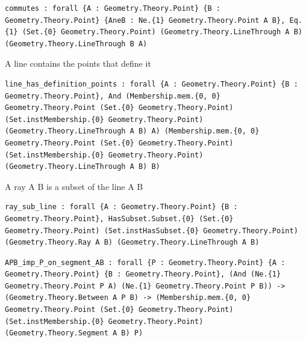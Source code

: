 \begin{theorem}
  \label{Geometry.Theory.Line.commutes}
  \leanok
\begin{verbatim}commutes : forall {A : Geometry.Theory.Point} {B : Geometry.Theory.Point} {AneB : Ne.{1} Geometry.Theory.Point A B}, Eq.{1} (Set.{0} Geometry.Theory.Point) (Geometry.Theory.LineThrough A B) (Geometry.Theory.LineThrough B A)\end{verbatim}
\end{theorem}

\begin{theorem}
  \label{Geometry.Theory.Line.line_has_definition_points}
  \leanok
  A line contains the points that define it 
\begin{verbatim}line_has_definition_points : forall {A : Geometry.Theory.Point} {B : Geometry.Theory.Point}, And (Membership.mem.{0, 0} Geometry.Theory.Point (Set.{0} Geometry.Theory.Point) (Set.instMembership.{0} Geometry.Theory.Point) (Geometry.Theory.LineThrough A B) A) (Membership.mem.{0, 0} Geometry.Theory.Point (Set.{0} Geometry.Theory.Point) (Set.instMembership.{0} Geometry.Theory.Point) (Geometry.Theory.LineThrough A B) B)\end{verbatim}
\end{theorem}

\begin{theorem}
  \label{Geometry.Theory.Line.ray_sub_line}
  \leanok
  A ray A B is a subset of the line A B 
\begin{verbatim}ray_sub_line : forall {A : Geometry.Theory.Point} {B : Geometry.Theory.Point}, HasSubset.Subset.{0} (Set.{0} Geometry.Theory.Point) (Set.instHasSubset.{0} Geometry.Theory.Point) (Geometry.Theory.Ray A B) (Geometry.Theory.LineThrough A B)\end{verbatim}
\end{theorem}

\begin{theorem}
  \label{Geometry.Theory.Line.APB_imp_P_on_segment_AB}
  \leanok
\begin{verbatim}APB_imp_P_on_segment_AB : forall {P : Geometry.Theory.Point} {A : Geometry.Theory.Point} {B : Geometry.Theory.Point}, (And (Ne.{1} Geometry.Theory.Point P A) (Ne.{1} Geometry.Theory.Point P B)) -> (Geometry.Theory.Between A P B) -> (Membership.mem.{0, 0} Geometry.Theory.Point (Set.{0} Geometry.Theory.Point) (Set.instMembership.{0} Geometry.Theory.Point) (Geometry.Theory.Segment A B) P)\end{verbatim}
\end{theorem}

